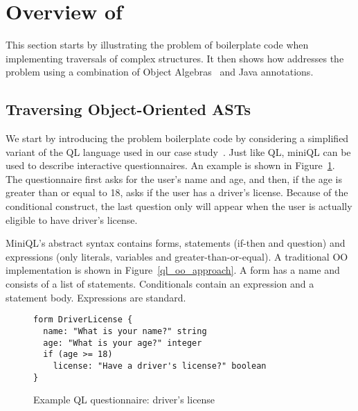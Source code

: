 \section{Overview of \name}\label{subsec:overview}

This section starts by illustrating the problem of boilerplate code when implementing
traversals of complex structures. It then shows how \name addresses
the problem using a combination of Object Algebras~\cite{bruno12oa}
and Java annotations.

\subsection{Traversing Object-Oriented ASTs  }



We start by introducing the problem boilerplate code by considering a simplified variant of the QL language used in our case study~\cite{gouseti14extensible}.
Just like QL, miniQL can be used to describe interactive questionnaires. An example is shown in Figure~\ref{driver_license}.
The questionnaire first asks for the user's name and age, and then, if the age is greater than or equal to 18, asks if the user has a driver's license.
Because of the conditional construct, the last question only will appear when the user is actually eligible to have driver's license.

MiniQL's abstract syntax contains forms, statements (if-then and question) and expressions (only literals, variables and greater-than-or-equal).
A traditional OO implementation is shown in Figure~\ref{ql_oo_approach}.
A form has a name and consists of a list of statements.
Conditionals contain an expression and a statement body. Expressions are standard.

\begin{figure}[t]
\nocaptionrule
\begin{lstlisting}[language=ql]
form DriverLicense {
  name: "What is your name?" string
  age: "What is your age?" integer
  if (age >= 18)
    license: "Have a driver's license?" boolean
}
\end{lstlisting}
\caption{Example QL questionnaire: driver's license}
\label{driver_license}
\end{figure}


